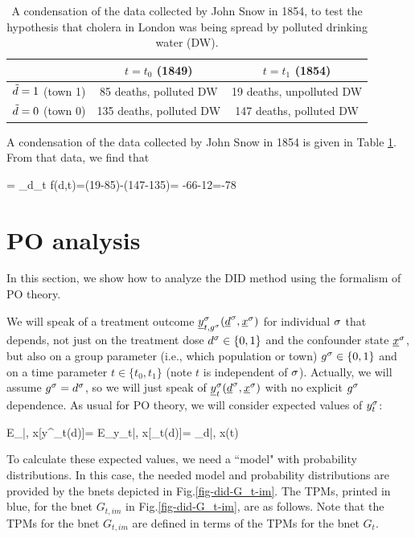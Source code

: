 \begin{table}[h!]
\centering
{\renewcommand{\arraystretch}{1.4}
\begin{tabular}{|c|c|c|}
\hline 
\rowcolor[HTML]{ECF4FF} 
 & $t=t_0 $ (1849) & $t=t_1$ (1854) \\ 
\hline
${\tilde{d}}=1 $ (town 1)\cellcolor[HTML]{ECF4FF}
&85 deaths, polluted DW&19 deaths, unpolluted DW\\
\hline 
${\tilde{d}}=0 $ (town 0)\cellcolor[HTML]{ECF4FF} 
&135 deaths, polluted DW& 147 deaths, polluted DW\\ 
\end{tabular}
}
\caption{A condensation of the data
collected by 
John Snow in 1854,
to test the hypothesis
that cholera in London was being spread by
polluted drinking water (DW).}
\label{tab-john-snow}
\end{table}

A condensation of the
data collected by John Snow in 1854
is given in Table \ref{tab-john-snow}.
From that data, we find that

\beq
\delta= \Delta_d\Delta_t f(d,t)=(19-85)-(147-135)=
-66-12=-78
\eeq



\section{PO analysis}
In this section,
we show how
to analyze the
DID method
using the formalism of PO theory.

We will speak of a treatment 
outcome
${\underline{y}}^\sigma_{t, g^\sigma}
({\underline{d}}^\sigma, {\underline{x}}^\sigma)$
for individual $\sigma$
that depends, not 
just on the treatment dose 
$d^\sigma\in \{0,1\}$
and the confounder state ${\underline{x}}^\sigma$,
but also
on a group parameter (i.e., which population
or town)
$g^\sigma\in \{0,1\}$
and on a time parameter $t\in\{t_0, t_1\}$ 
(note $t$ is independent of $\sigma$).
Actually,
we will assume $g^\sigma=d^\sigma$,
so we will just speak of
${\underline{y}}^\sigma_t({\underline{d}}^\sigma, {\underline{x}}^\sigma)$
with no explicit $g^\sigma$
dependence. As usual for PO theory,
we will consider
expected values of $y^\sigma_t$:


\beq
E_{\s|\td, x}[y^\s_t(d)]=
 E_{y_t|\td, x}[\rvy_t(d)]=
\caly_{d|\td, x}(t)
\eeq

To calculate these
expected values, we need a ``model"
with probability 
distributions.
In this case,
the needed model and probability
distributions are
provided by the
bnets depicted in Fig.\ref{fig-did-G_t-im}.
The TPMs,
printed in blue,
for the 
 bnet
$G_{t, im}$
in Fig.\ref{fig-did-G_t-im},
are as follows.
Note
that the
TPMs for the bnet $G_{t, im}$
are defined in 
terms
of the TPMs for the bnet $G_t$.



